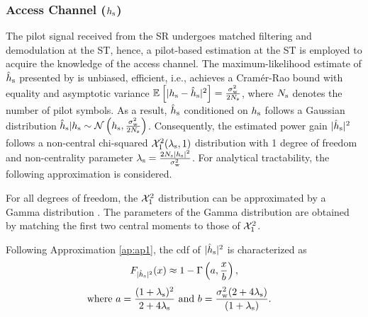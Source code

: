 \subsubsection*{Access Channel ($h_{\text{s}}$)}
The pilot signal received from the SR undergoes matched filtering and demodulation at the ST, hence, a pilot-based estimation at the ST is employed to acquire the knowledge of the access channel. The maximum-likelihood estimate of $\hat{h}_{\text{s}}$ presented by \cite{Gifford08} is unbiased, efficient, i.e., achieves a Cram\'er-Rao bound with equality and asymptotic variance ${\mathbb E}_{}\left[ |h_{\text{s}} -\hat{h}_{\text{s}}|^2 \right] = \frac{\sigma^2_{\text{w}}}{2 N_{\text{s}}}$, where $N_{\text{s}}$ denotes the number of pilot symbols. As a result, $\hat{h}_{\text{s}}$ conditioned on $h_{\text{s}}$ follows a Gaussian distribution
$\hat{h}_{\text{s}}|h_{\text{s}} \sim \mathcal{N}\left( h_{\text{s}},\frac{\sigma^2_{\text{w}}}{2 N_{\text{s}}} \right)$.
Consequently, the estimated power gain $|\hat{h}_{\text{s}}|^2$ follows a non-central chi-squared $\ncchi2(\ls, 1)$ distribution with 1 degree of freedom and non-centrality parameter $\lambda_{\text{s}} = \frac{2 N_{\text{s}} |h_{\text{s}}|^2}{\sigma^2_{\text{w}}}$. For analytical tractability, the following approximation is considered. 
\begin{approxi} \label{ap:ap1}
\normalfont 
For all degrees of freedom, the $\ncchi2$ distribution can be approximated by a Gamma distribution \cite{abramo}. The parameters of the Gamma distribution are obtained by matching the first two central moments to those of $\ncchi2$.
\end{approxi}
Following Approximation \ref{ap:ap1}, the cdf of $|\hat{h}_{\text{s}}|^2$ is characterized as
\begin{align}
F_{|\hat{h}_{\text{s}}|^2}(x) \approx 1 - \Gamma \left(a, \frac{x}{b} \right) \label{eq:fephs}, 
\end{align}
\begin{align}
\text{where  } a = \frac{(1 + \lambda_{\text{s}})^2}{2 + 4 \lambda_{\text{s}}} &\text{ and } b = \frac{\sigma^2_{\text{w}} (2 + 4 \lambda_{\text{s}})}{(1 + \lambda_{\text{s}})}.  \label{eq:para_hs} 
\end{align}

